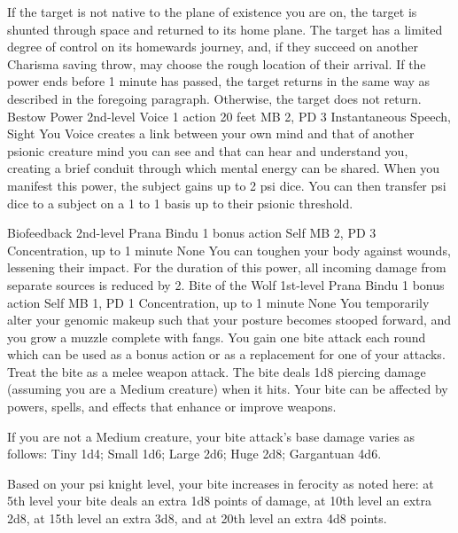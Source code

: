 If the target is not native to the plane of existence you are on,
the target is shunted through space and returned to its home plane.
The target has a limited degree of control on its homewards journey,
and, if they succeed on another Charisma saving throw,
may choose the rough location of their arrival.
If the power ends before 1 minute has passed,
the target returns in the same way as described in the foregoing paragraph.
Otherwise,
the target does not return.
\DndPowerHeader%
    {Bestow Power\label{pwr:bestow_power}}
    {2nd-level Voice}
    {1 action}
    {20 feet}
    {MB 2, PD 3}
    {Instantaneous}
    {Speech, Sight}
You Voice creates a link between your own
mind and that of another psionic creature mind you can see
and that can hear and understand you,
creating a brief conduit through which mental energy can be
shared. When you manifest this power, the subject gains up
to 2 psi dice. You can then transfer psi dice to a subject
on a 1 to 1 basis up to their psionic threshold.

\DndPowerHeader%
    {Biofeedback\label{pwr:biofeedback}}
    {2nd-level Prana Bindu}
    {1 bonus action}
    {Self}
    {MB 2, PD 3}
    {Concentration, up to 1 minute}
    {None}
You can toughen your body against wounds,
lessening their impact. For the duration of this power,
all incoming damage from separate sources is reduced by 2.
\DndPowerHeader%
    {Bite of the Wolf\label{pwr:bite_of_the_wolf}}
    {1st-level Prana Bindu}
    {1 bonus action}
    {Self}
    {MB 1, PD 1}
    {Concentration, up to 1 minute}
    {None}
You temporarily alter your genomic makeup
such that your posture becomes stooped forward, and you grow
a muzzle complete with fangs. You gain one bite attack each
round which can be used as a bonus action or as a replacement
for one of your attacks. Treat the bite as a melee weapon
attack. The bite deals 1d8 piercing damage (assuming you are
a Medium creature) when it hits. Your bite can be affected
by powers, spells, and effects that enhance or improve weapons.

If you are not a Medium creature, your bite attack's base
damage varies as follows: Tiny 1d4; Small 1d6; Large 2d6;
Huge 2d8; Gargantuan 4d6.

Based on your psi knight level, your bite increases in ferocity
as noted here: at 5th level your bite deals an extra 1d8 points
of damage, at 10th level an extra 2d8, at 15th level an extra
3d8, and at 20th level an extra 4d8 points.

